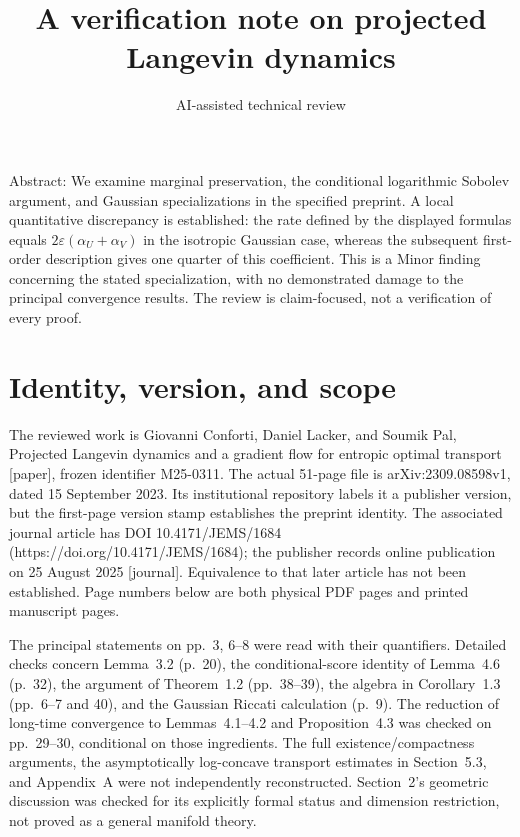 \documentclass[10pt]{article}
\title{A verification note on projected Langevin dynamics}
\author{AI-assisted technical review}
\date{}
\begin{document}
\maketitle
Abstract: We examine marginal preservation, the conditional logarithmic Sobolev argument, and Gaussian specializations in the specified preprint. A local quantitative discrepancy is established: the rate defined by the displayed formulas equals \(2\varepsilon(\alpha_U+\alpha_V)\) in the isotropic Gaussian case, whereas the subsequent first-order description gives one quarter of this coefficient. This is a Minor finding concerning the stated specialization, with no demonstrated damage to the principal convergence results. The review is claim-focused, not a verification of every proof.\par
\section*{Identity, version, and scope}
The reviewed work is Giovanni Conforti, Daniel Lacker, and Soumik Pal, Projected Langevin dynamics and a gradient flow for entropic optimal transport [paper], frozen identifier M25-0311. The actual 51-page file is arXiv:2309.08598v1, dated 15 September 2023. Its institutional repository labels it a publisher version, but the first-page version stamp establishes the preprint identity. The associated journal article has DOI 10.4171/JEMS/1684 (https://doi.org/10.4171/JEMS/1684); the publisher records online publication on 25 August 2025 [journal]. Equivalence to that later article has not been established. Page numbers below are both physical PDF pages and printed manuscript pages.\par
The principal statements on pp. 3, 6–8 were read with their quantifiers. Detailed checks concern Lemma 3.2 (p. 20), the conditional-score identity of Lemma 4.6 (p. 32), the argument of Theorem 1.2 (pp. 38–39), the algebra in Corollary 1.3 (pp. 6–7 and 40), and the Gaussian Riccati calculation (p. 9). The reduction of long-time convergence to Lemmas 4.1–4.2 and Proposition 4.3 was checked on pp. 29–30, conditional on those ingredients. The full existence/compactness arguments, the asymptotically log-concave transport estimates in Section 5.3, and Appendix A were not independently reconstructed. Section 2’s geometric discussion was checked for its explicitly formal status and dimension restriction, not proved as a general manifold theory.\par
\end{document}
